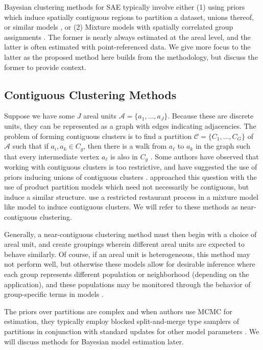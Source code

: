 \documentclass[twoside,12pt,bibstyle=chem-acs]{reedthesis}
\begin{document}
Bayesian clustering methods for SAE typically involve either
(1) using priors which induce spatially contiguous regions to partition a dataset, unions thereof, or similar models \cite{knorrheld_bayesian_2000, hegarty_bayesian_2008, bhattacharyya_bayesian_2026}, or (2) Mixture models with spatially correlated group assignments \cite{povala_burglary_2020, fernandez_modelling_2002}. The former is nearly always estimated at the areal level, and the latter is often estimated with point-referenced data. We give more focus to the latter as the proposed method here builds from the methodology, but discuss the former to provide context.

\subsection{Contiguous Clustering Methods}
Suppose we have some $J$ areal units $\mathcal{A} = \{a_1, \dots, a_J\}$. Because these are discrete units, they can be represented as a graph with edges indicating adjacencies. The problem of forming contiguous clusters is to find a partition $\mathcal{C} = \{C_1, \dots, C_G\}$ of $\mathcal{A}$ such that if $a_i, a_k \in C_g$, then there is a walk from $a_\ell$ to $a_k$ in the graph such that every intermediate vertex $a_\ell$ is also in $C_g$ \cite{knorrheld_bayesian_2000, come_bayesian_2024}. 
Some authors have observed that working with contiguous clusters is too restrictive, and have suggested the use of priors inducing unions of contiguous clusters \cite{bhattacharyya_bayesian_2026}. \citeauthor{hegarty_bayesian_2008} approached this question with the use of product partition models which need not necessarily be contiguous, but induce a similar structure. \citeauthor{wehrhahn_bayesian_2020} use a restricted restaurant process in a mixture model like model to induce contiguous clusters. 
We will refer to these methods as near-contiguous clustering.

Generally, a near-contiguous clustering method must then begin with a choice of areal unit, and create groupings wherein different areal units are expected to behave similarly. Of course, if an areal unit is heterogeneous, this method may not perform well, but otherwise these models allow for desirable inference where each group represents different population or neighborhood (depending on the application), and these populations may be monitored through the behavior of group-specific terms in models \cite{balocchi_crime_2023}.

The priors over partitions are complex and when authors use MCMC for estimation, they typically employ blocked split-and-merge type samplers of partitions in conjunction with standard updates for other model parameters \cite{bhattacharyya_bayesian_2026,hegarty_bayesian_2008}. We will discuss methods for Bayesian model estimation later.
\end{document}
